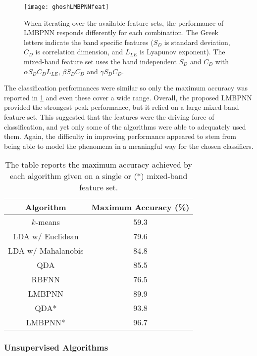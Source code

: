 \begin{figure}
\centering
\texttt{[image: ghoshLMBPNNfeat]}
\caption[Impact of features on LMBPNN classification]{When iterating over the available feature sets, the performance of \ac{LMBPNN} responds differently for each combination. The Greek letters indicate the band specific features ($S_{D}$ is standard deviation, $C_{D}$ is correlation dimension, and $L_{LE}$ is Lyapunov exponent). The mixed-band feature set uses the band independent $S_{D}$ and $C_{D}$ with $\alpha S_{D} C_{D} L_{LE}$, $\beta S_{D} C_{D}$ and $\gamma S_{D} C_{D}$.}
\label{fig:ghoshLMBPNN}
\end{figure}

The classification performances were similar so only the maximum accuracy was reported in \cref{tab:ghosh} and even these cover a wide range. Overall, the proposed \ac{LMBPNN} provided the strongest peak performance, but it relied on a large mixed-band feature set. This suggested that the features were the driving force of classification, and yet only some of the algorithms were able to adequately used them. Again, the difficulty in improving performance appeared to stem from being able to model the phenomena in a meaningful way for the chosen classifiers.

\begin{table}[ht]
\caption[Classification accuracy of single and mixed band feature sets]{The table reports the maximum accuracy achieved by each algorithm given on a single or (*) mixed-band feature set.}
\centering
\begin{tabular}{ c c }
\toprule
Algorithm & Maximum Accuracy (\%) \\
\midrule
$k$-means & 59.3 \\
LDA w/ Euclidean & 79.6 \\
LDA w/ Mahalanobis & 84.8 \\
QDA & 85.5 \\
RBFNN & 76.5 \\
LMBPNN & 89.9 \\
QDA* & 93.8 \\
LMBPNN* & 96.7 \\
\bottomrule
\end{tabular}
\label{tab:ghosh}
\end{table}

\subsubsection{Unsupervised Algorithms}

